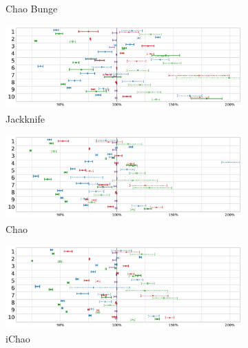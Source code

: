 \documentclass[sigconf,review,anonymous]{acmart}
\newcommand{\ChaoBunge}{Chao Bunge\xspace}
\newcommand{\Jackknife}{Jackknife\xspace}
\newcommand{\Chao}{Chao\xspace}
\newcommand{\improvedChao}{iChao\xspace}
\begin{document}
\begin{figure}
\begin{subfigure}{.49\textwidth}
\vspace*{-3mm}
\caption{\ChaoBunge}
\end{subfigure}
\begin{subfigure}{.49\textwidth}
    \centering
      \includegraphics[width=0.95\linewidth]{charts/ggplot/estimators-no-title/Jackknife.pdf}
\vspace*{-3mm}
\caption{\Jackknife}
\end{subfigure}
\begin{subfigure}{.49\textwidth}
    \centering
      \includegraphics[width=0.95\linewidth]{charts/ggplot/estimators-no-title/Chao.pdf}
\vspace*{-3mm}
\caption{\Chao}
\end{subfigure}
\begin{subfigure}{.49\textwidth}
    \centering
      \includegraphics[width=0.95\linewidth]{charts/ggplot/estimators-no-title/iChao.pdf}
\vspace*{-3mm}
\caption{\improvedChao}
\end{subfigure}
\begin{subfigure}{.49\textwidth}
    \centering

\end{subfigure}
\end{figure}
\end{document}
